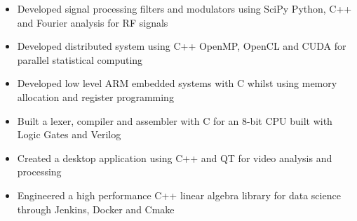 \documentclass[11pt,a4paper,ragged2e]{altacv}
\begin{document}
\begin{paracol}{1}
\begin{itemize}
\item Developed signal processing filters and modulators using SciPy Python, C++ and Fourier analysis for RF signals 
\item Developed distributed system using C++ OpenMP, OpenCL and CUDA for parallel statistical computing
\item Developed low level ARM embedded systems with C whilst using memory allocation and register programming
\item Built a lexer, compiler and assembler with C for an 8-bit CPU built with Logic Gates and Verilog
\item Created a desktop application using C++ and QT for video analysis and processing
\item Engineered a high performance C++ linear algebra library for data science through Jenkins, Docker and Cmake
\end{itemize}
\tightdivider


\end{paracol}
\end{document}
